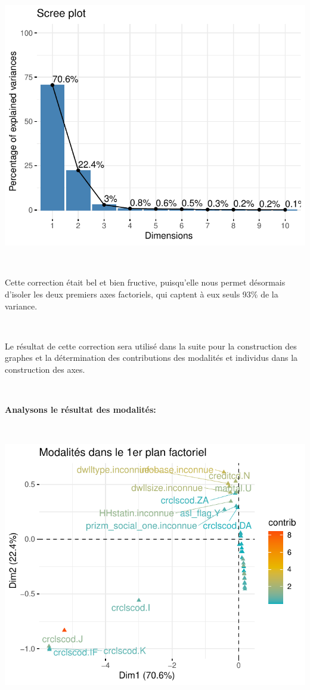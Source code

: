 \documentclass[]{imsart}
\numberwithin{equation}{section}
\theoremstyle{plain}
\begin{document}
\begin{flushleft}\includegraphics{Analyse_Exploratoire_Projet_files/figure-latex/unnamed-chunk-32-1} \end{flushleft}

~

Cette correction était bel et bien fructive, puisqu'elle nous permet désormais d'isoler les deux premiers axes factoriels, qui captent à eux seuls 93\% de la variance.

~

Le résultat de cette correction sera utilisé dans la suite pour la construction des graphes et la détermination des contributions des modalités et individus dans la construction des axes.

~

\textbf{Analysons le résultat des modalités:}

~

\begin{flushleft}\includegraphics{Analyse_Exploratoire_Projet_files/figure-latex/unnamed-chunk-33-1} \end{flushleft}
\end{document}
